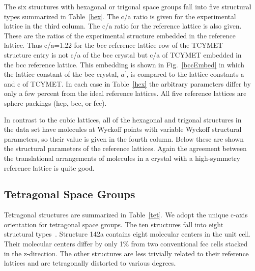\documentclass[preprint]{revtex4}              %
\begin{document}
The six structures with hexagonal or trigonal space groups fall into
five structural types summarized in Table~\ref{hex}.  The c/a ratio
is given for the experimental lattice in the third column. The c/a
ratio for the reference lattice is also given.  These are the ratios
of the experimental structure embedded in the reference lattice.
Thus c/a=1.22 for the bcc reference lattice row of the TCYMET
structure entry is not c/a of the bcc crystal but c/a of TCYMET
embedded in the bcc reference lattice. This embedding is shown in
Fig.\ \ref{bccEmbed} in which the lattice constant of the bcc
crystal, $a^\prime$, is compared to the lattice constants a and c of
TCYMET. In each case in Table~\ref{hex} the arbitrary parameters
differ by only a few percent from the ideal reference lattices. All
five reference lattices are sphere packings (hcp, bcc, or fcc).

In contrast to the cubic lattices, all of the hexagonal and trigonal
structures in the data set have molecules at Wyckoff points with
variable Wyckoff structural parameters, so their value is given in
the fourth column. Below these are shown the structural parameters
of the reference lattices.  Again the agreement between the
translational arrangements of molecules in a crystal with a
high-symmetry reference lattice is quite good.

\subsection{Tetragonal Space Groups}
\label{sec:tet}

Tetragonal structures are summarized in Table~\ref{tet}. We adopt
the unique c-axis orientation for tetragonal space groups. The ten
structures fall into eight structural types~\cite{mcclurg}. Structure 142a contains
eight molecular centers in the unit cell.  Their molecular centers
differ by only 1\% from two conventional fcc cells stacked in the
z-direction.  The other structures are less trivially related to
their reference lattices and are tetragonally distorted to various
degrees.
\end{document}
